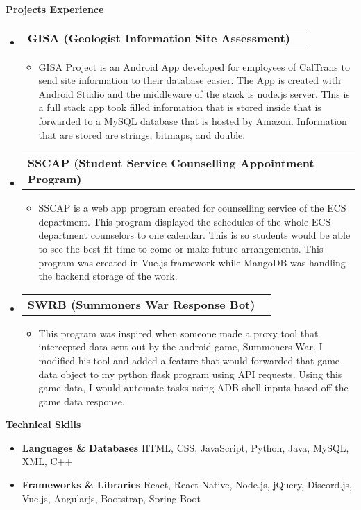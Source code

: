 \documentclass[letterpaper,12pt]{article}[leftmargin=*]
\makeatletter
\def \entryspacing {-0pt}
\renewcommand{\section}[2]{\vspace{5pt}
  \colorbox{secondary}{\color{white}\raggedbottom\normalsize\textbf{{#1}{\hspace{7pt}#2}}}
}
\newcommand{\resumeEntryStart}{\begin{itemize}[leftmargin=2.5mm]}
\newcommand{\resumeEntryEnd}{\end{itemize}\vspace{\entryspacing}}
\newcommand{\resumeItemListStart}{\begin{itemize}[leftmargin=4.5mm]}
\newcommand{\resumeItemListEnd}{\end{itemize}}
\newcommand{\resumeItem}[1]{
  \item\small{
    {#1 \vspace{-2pt}}
  }
}
\newcommand{\resumeEntryTD}[2]{
  \vspace{-1pt}\item[]
    \begin{tabularx}{0.97\textwidth}{X@{\hspace{60pt}}r}
      \textbf{\color{primary}#1} & {\firabook\color{accent}\small#2} \\
    \end{tabularx}\vspace{-6pt}
}
\newcommand{\resumeEntryS}[2]{
  \item[]\small{
    \textbf{\color{primary}#1 }{ #2 \vspace{-6pt}}
  }
}
\makeatother
\begin{document}
\section{\faFlask}{Projects Experience}

  \resumeEntryStart
    \resumeEntryTD
      {GISA (Geologist Information Site Assessment)}{}
    \resumeItemListStart
      \resumeItem {GISA Project is an Android App developed for employees of CalTrans to send site information to their database easier. The App is created with Android Studio and the middleware of the stack is node.js server. This is a full stack app took filled information that is stored inside that is forwarded to a MySQL database that is hosted by Amazon. Information that are stored are strings, bitmaps, and double.}
    \resumeItemListEnd
  \resumeEntryEnd

  \resumeEntryStart
    \resumeEntryTD
      {SSCAP (Student Service Counselling Appointment Program)}{}
    \resumeItemListStart
      \resumeItem {SSCAP is a web app program created for counselling service of the ECS department. This program displayed the schedules of the whole ECS department counselors to one calendar. This is so students would be able to see the best fit time to come or make future arrangements. This program was created in Vue.js framework while MangoDB was handling the backend storage of the work. }
    \resumeItemListEnd
  \resumeEntryEnd

  \resumeEntryStart
    \resumeEntryTD
      {SWRB (Summoners War Response Bot)}{}
    \resumeItemListStart
      \resumeItem {This program was inspired when someone made a proxy tool that intercepted data sent out by the android game, Summoners War. I modified his tool and added a feature that would forwarded that game data object to my python flask program using API requests. Using this game data, I would automate tasks using ADB shell inputs based off the game data response.}
    \resumeItemListEnd
  \resumeEntryEnd

\section{\faGears}{Technical Skills}
 \resumeEntryStart
  \resumeEntryS{Languages \& Databases } {HTML, CSS, JavaScript, Python, Java, MySQL, XML, C++}
  \resumeEntryS{Frameworks \& Libraries} {React, React Native, Node.js, jQuery, Discord.js, Vue.js, Angularjs, Bootstrap, Spring Boot}
 \resumeEntryEnd
\end{document}
